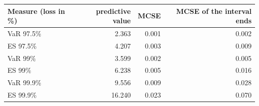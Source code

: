 \begin{tabular}{lrrr}
\toprule
Measure (loss in \%) & predictive value & MCSE & MCSE of the interval ends \\
\midrule
VaR 97.5\% & 2.363 & 0.001 & 0.002 \\
ES 97.5\% & 4.207 & 0.003 & 0.009 \\
VaR 99\% & 3.599 & 0.002 & 0.005 \\
ES 99\% & 6.238 & 0.005 & 0.016 \\
VaR 99.9\% & 9.556 & 0.009 & 0.028 \\
ES 99.9\% & 16.240 & 0.023 & 0.070 \\
\bottomrule
\end{tabular}
